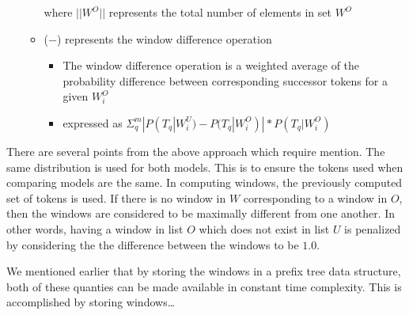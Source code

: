 \begin{enumerate}
\begin{itemize}
    where $||W^O||$ represents the total number of elements in set $W^O$
  \item ($-$) represents the window difference operation
    \begin{itemize}
    \item The window difference operation is
      a weighted average of the probability difference
      between corresponding successor tokens for a given $W_i^O$
    \item expressed as $\Sigma_q^m |P(T_q|W_i^U)-P(T_q|W_i^O)| * P(T_q|W_i^O)$
    \end{itemize}
  \end{itemize}
\end{enumerate}
%
There are several points from the above approach which require mention.
%
The same distribution is used for both models.
This is to ensure the tokens used when comparing models are the same.
%
In computing windows, 
the previously computed set of tokens is used.
%
%
If there is no window in $W$ corresponding to a window in $O$,
then the windows are considered to be maximally different from one another.
In other words,
having a window in list $O$ which does not exist in list $U$ is
penalized by considering the the difference between the windows to be $1.0$.


We mentioned earlier that
by storing the windows in a prefix tree data structure,
both of these quanties can be made available in
constant time complexity.
%
This is accomplished by storing windows\dots


